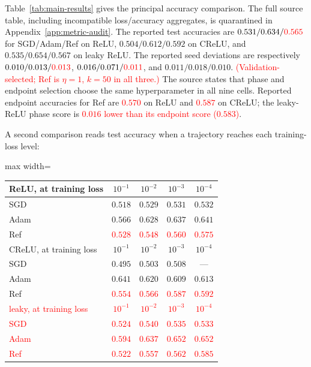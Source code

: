 \documentclass{article}
\newcommand{\nat}[1]{\textcolor{red}{#1}}
\theoremstyle{definition}
\theoremstyle{remark}
\begin{document}
Table~\ref{tab:main-results} gives the principal accuracy comparison. The full source table, including incompatible loss/accuracy aggregates, is quarantined in Appendix~\ref{app:metric-audit}. The reported test accuracies are $0.531/0.634/\nat{0.565}$ for SGD/Adam/Ref on ReLU, $0.504/0.612/0.592$ on CReLU, and $0.535/0.654/0.567$ on leaky ReLU. The reported seed deviations are respectively $0.010/0.013/\nat{0.013}$, $0.016/0.071/\nat{0.011}$, and $0.011/0.018/0.010$. \nat{(Validation-selected; Ref is $\eta=1$, $k=50$ in all three.)} The source states that phase and endpoint selection choose the same hyperparameter in all nine cells. Reported endpoint accuracies for Ref are \nat{$0.570$} on ReLU and \nat{$0.587$} on CReLU; the leaky-ReLU phase score is \nat{$0.016$ lower than its endpoint score ($0.583$)}.

A second comparison reads test accuracy when a trajectory reaches each training-loss level:

\begin{center}\small
\begin{adjustbox}{max width=\linewidth}
\begin{tabular}{lcccc}
\toprule
ReLU, at training loss & $10^{-1}$ & $10^{-2}$ & $10^{-3}$ & $10^{-4}$ \\
\midrule
SGD & $0.518$ & $0.529$ & $0.531$ & $0.532$ \\
Adam             & $0.566$ & $0.628$ & $0.637$ & $\mathbf{0.641}$ \\
Ref        & \nat{$0.528$} & \nat{$0.548$} & \nat{$0.560$} & \nat{$0.575$} \\
\midrule
CReLU, at training loss & $10^{-1}$ & $10^{-2}$ & $10^{-3}$ & $10^{-4}$ \\
\midrule
SGD & $0.495$ & $0.503$ & $0.508$ & --- \\
Adam             & $0.641$ & $0.620$ & $0.609$ & $\mathbf{0.613}$ \\
Ref        & \nat{$0.554$} & \nat{$0.566$} & \nat{$0.587$} & \nat{$0.592$} \\
\midrule
\nat{leaky, at training loss} & \nat{$10^{-1}$} & \nat{$10^{-2}$} & \nat{$10^{-3}$} & \nat{$10^{-4}$} \\
\midrule
\nat{SGD} & \nat{$0.524$} & \nat{$0.540$} & \nat{$0.535$} & \nat{$0.533$} \\
\nat{Adam} & \nat{$0.594$} & \nat{$0.637$} & \nat{$0.652$} & \nat{$\mathbf{0.652}$} \\
\nat{Ref} & \nat{$0.522$} & \nat{$0.557$} & \nat{$0.562$} & \nat{$0.585$} \\
\bottomrule
\end{tabular}
\end{adjustbox}
\end{center}
\end{document}
